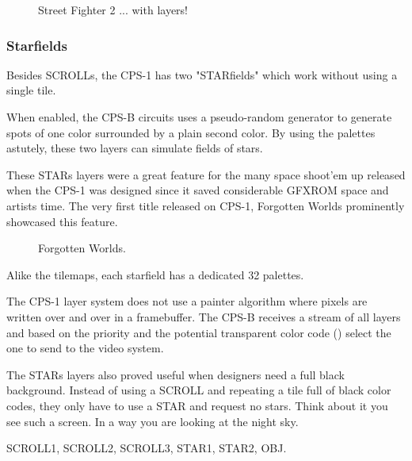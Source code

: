 \vfill
\begin{figure}[!b]
 \caption*{Street Fighter 2 ... with layers!}%
 \end{figure}%
\pagebreak


\subsubsection{Starfields}
Besides SCROLLs, the CPS-1 has two "STARfields" which work without using a single tile. 

When enabled, the CPS-B circuits uses a pseudo-random generator to generate spots of one color surrounded by a plain second color. By using the palettes astutely, these two layers can simulate fields of stars. 

These STARs layers were a great feature for the many space shoot'em up released when the CPS-1 was designed since it saved considerable GFXROM space and artists time. The very first title released on CPS-1, Forgotten Worlds prominently showcased this feature.

\vfill
\begin{figure}[!b]
 \caption*{Forgotten Worlds.}%
 \end{figure}%
\pagebreak

Alike the tilemaps, each starfield has a dedicated 32 palettes.

\begin{trivia}
The CPS-1 layer system does not use a painter algorithm where pixels are written over and over in a framebuffer. The CPS-B receives a stream of all layers and based on the priority and the potential transparent color code () select the one to send to the video system.
\end{trivia}

The STARs layers also proved useful when designers need a full black background. Instead of using a SCROLL and repeating a tile full of black color codes, they only have to use a STAR and request no stars. Think about it you see such a screen. In a way you are looking at the night sky.

 SCROLL1,  SCROLL2,  SCROLL3,  STAR1,  STAR2,  OBJ.

